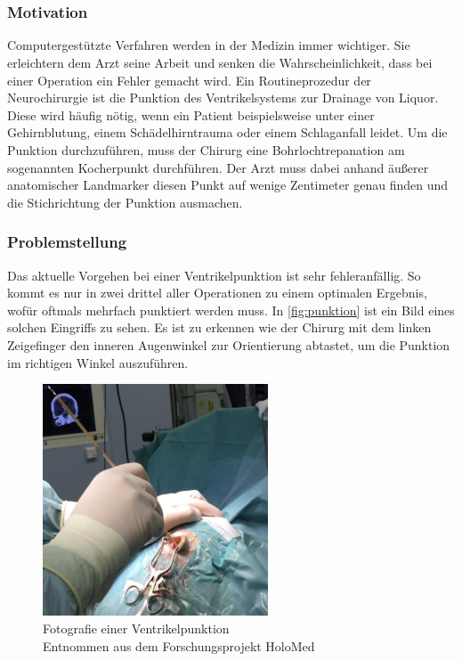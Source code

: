 \chapter{}
\label{sec:Introduction}

\subsection{Motivation}

Computergestützte Verfahren werden in der Medizin immer wichtiger. Sie erleichtern dem Arzt seine Arbeit und senken die Wahrscheinlichkeit, dass bei einer Operation ein Fehler gemacht wird.
\newline
Ein Routineprozedur der Neurochirurgie ist die Punktion des Ventrikelsystems zur Drainage von Liquor. Diese wird häufig nötig, wenn ein Patient beispielsweise unter einer Gehirnblutung, einem Schädelhirntrauma oder einem Schlaganfall leidet.
\newline
Um die Punktion durchzuführen, muss der Chirurg eine Bohrlochtrepanation am sogenannten Kocherpunkt durchführen. Der Arzt muss dabei anhand äußerer anatomischer Landmarker diesen Punkt auf wenige Zentimeter genau finden und die Stichrichtung der Punktion ausmachen.



\subsection{Problemstellung}

Das aktuelle Vorgehen bei einer Ventrikelpunktion ist sehr fehleranfällig. So kommt es nur in zwei drittel aller Operationen zu einem optimalen Ergebnis, wofür oftmals mehrfach punktiert werden muss. In \autoref{fig:punktion} ist ein Bild eines solchen Eingriffs zu sehen. Es ist zu erkennen wie der Chirurg mit dem linken Zeigefinger den inneren Augenwinkel zur Orientierung abtastet, um die Punktion im richtigen Winkel auszuführen.


\begin{figure}[!h] 
\centering 
\includegraphics[width=0.6\textwidth]{Logos/Punktion2.png}
\caption{Fotografie einer Ventrikelpunktion  \\ Entnommen aus dem Forschungsprojekt HoloMed \protect\cite{punktion}} 
\label{fig:punktion} 
\end{figure}



